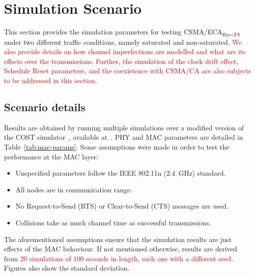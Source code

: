 \section{Simulation Scenario}\label{simulations}
This section provides the simulation parameters for testing CSMA/ECA$_{\text{Hys+FS}}$ under two different traffic conditions, namely saturated and non-saturated. \textcolor{red}{We also provide details on how channel imperfections are modelled and what are its effects over the transmissions. Further, the simulation of the clock drift effect, Schedule Reset parameters, and the coexistence with CSMA/CA are also subjects to be addressed in this section.}

	\subsection{Scenario details}
	Results are obtained by running multiple simulations over a modified version of the COST simulator~\cite{COST}, available at~\cite{sim:parameters-TON}. PHY and MAC parameters are detailed in Table~\ref{tab:mac-params}. Some assumptions were made in order to test the performance at the MAC layer:
	
	\begin{itemize}
		\item Unspecified parameters follow the IEEE 802.11n ($2.4$~GHz) standard.
		\item All nodes are in communication range.
		\item No Request-to-Send (RTS) or Clear-to-Send (CTS) messages are used.
		\item Collisions take as much channel time as successful transmissions.
	\end{itemize}
	
	The aforementioned assumptions ensure that the simulation results are just effects of the MAC behaviour.
	If not mentioned otherwise, results are derived from \textcolor{red}{20 simulations of 100 seconds in length, each one with a different seed}. Figures also show the standard deviation.
	
